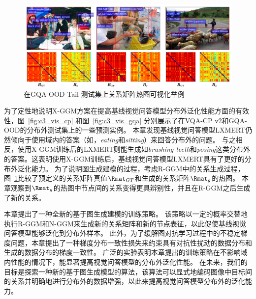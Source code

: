 \begin{figure}[!t]
\centering
\includegraphics[width=0.95\linewidth]{figure/c3_vis_r.pdf}
\caption{在GQA-OOD Tail 测试集上关系矩阵热图可视化举例
}
\label{fig:c3_vis_Rmat_additional}
\end{figure}




为了定性地说明X-GGM方案在提高基线视觉问答模型分布外泛化性能方面的有效性，图~\ref{fig:c3_vis_cp} 和图~\ref{fig:c3_vis_gqa} 分别展示了在VQA-CP v2和GQA-OOD的分布外测试集上的一些预测实例。
本章发现基线视觉问答模型LXMERT仍然倾向于使用域内的答案（如，\textit{eating}和\textit{sitting}）来回答分布外的问题。
与之相反，使用X-GGM训练后的LXMERT则能生成如\textit{brushing teeth}和\textit{posing}这类分布外的答案。这表明使用X-GGM训练后，基线视觉问答模型LXMERT具有了更好的分布外泛化能力。
为了说明图生成建模的过程，考虑R-GGM中的关系生成过程，图~\ref{fig:c3_vis_Rmat_additional}比较了预定义的关系矩阵真值$\Rmat_{GT}$和生成的关系矩阵$\Rmat_{g}$的热图。
本章观察到$\Rmat_{g}$的热图中节点间的关系变得更具辨别性，并且在R-GGM之后生成了新的关系。





本章提出了一种全新的基于图生成建模的训练策略。
该策略以一定的概率交替地执行R-GGM和N-GGM来生成新的关系矩阵和新的节点表征，以此促使基线视觉问答模型能够泛化到分布外样本。
此外，为了缓解图对抗学习过程中的不稳定梯度问题，本章提出了一种梯度分布一致性损失来约束具有对抗性扰动的数据分布和生成的数据分布的梯度一致性。
广泛的实验表明本章提出的训练策略在不影响域内性能的情况下，能显著提高视觉问答模型的分布外泛化性能。
在未来，我们的目标是探索一种新的基于图生成模型的算法，该算法可以显式地编码图像中目标间的关系并明确地进行分布外的数据增强，以此来提高视觉问答模型分布外的泛化能力。


